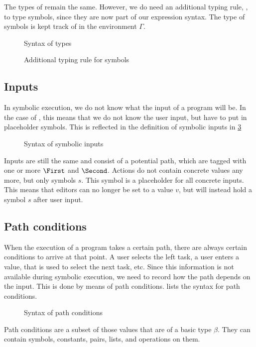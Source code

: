 The types of \TOPHAT remain the same.
However, we do need an additional typing rule, , to type symbols,
since they are now part of our expression syntax.
The type of symbols is kept track of in the environment $\Gamma$.

\begin{figure}
  \small
  \caption{Syntax of \TOPHAT types}
  \label{fig:syntaxtypes}
\end{figure}

\begin{figure}
  \small
  \caption{Additional typing rule for symbols}
  \label{fig:typingsymbol}
\end{figure}


\subsection{Inputs}

In symbolic execution, we do not know what the input of a program will be.
In the case of \TOPHAT, this means that we do not know the user input, but have to put in placeholder symbols.
This is reflected in the definition of symbolic inputs in \cref{fig:syntaxinputs}

\begin{figure}
  \small
  \caption{Syntax of symbolic inputs}
  \label{fig:syntaxinputs}
\end{figure}

Inputs are still the same and consist of a potential path, which are tagged with one or more $\First$ and $\Second$.
Actions do not contain concrete values any more, but only symbols $s$.
This symbol is a placeholder for all concrete inputs.
This means that editors can no longer be set to a value $v$, but will instead hold a symbol $s$ after user input.


\subsection{Path conditions}

When the execution of a \TOPHAT program takes a certain path, there are always certain conditions to arrive at that point.
A user selects the left task, a user enters a value, that is used to select the next task, etc.
Since this information is not available during symbolic execution, we need to record how the path depends on the input.
This is done by means of path conditions.
 lists the syntax for path conditions.

\begin{figure}
  \small
  \caption{Syntax of path conditions}
  \label{fig:syntaxpredicates}
\end{figure}

Path conditions are a subset of those values that are of a basic type $\beta$.
They can contain symbols, constants, pairs, lists, and operations on them.
